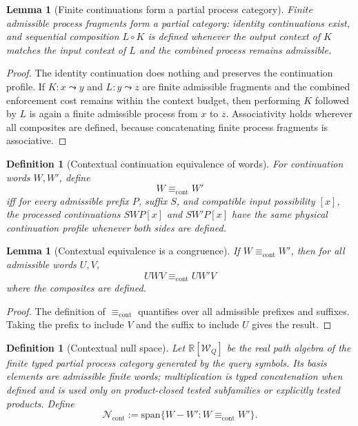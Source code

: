 \documentclass[11pt]{article}
\newtheorem{lemma}[theorem]{Lemma}
\newtheorem{definition}[theorem]{Definition}
\begin{document}
\begin{lemma}[Finite continuations form a partial process category]
Finite admissible process fragments form a partial category: identity continuations exist, and sequential composition $L\circ K$ is defined whenever the output context of $K$ matches the input context of $L$ and the combined process remains admissible.
\end{lemma}
\begin{proof}
The identity continuation does nothing and preserves the continuation profile.  If $K:x\leadsto y$ and $L:y\leadsto z$ are finite admissible fragments and the combined enforcement cost remains within the context budget, then performing $K$ followed by $L$ is again a finite admissible process from $x$ to $z$.  Associativity holds wherever all composites are defined, because concatenating finite process fragments is associative.
\end{proof}

\begin{definition}[Contextual continuation equivalence of words]
For continuation words $W,W'$, define
\[
 W\equiv_{\mathrm{cont}}W'
\]
iff for every admissible prefix $P$, suffix $S$, and compatible input possibility $[x]$, the processed continuations $SWP[x]$ and $SW'P[x]$ have the same physical continuation profile whenever both sides are defined.
\end{definition}

\begin{lemma}[Contextual equivalence is a congruence]
If $W\equiv_{\mathrm{cont}}W'$, then for all admissible words $U,V$,
\[
 U W V\equiv_{\mathrm{cont}} U W' V
\]
where the composites are defined.
\end{lemma}
\begin{proof}
The definition of $\equiv_{\mathrm{cont}}$ quantifies over all admissible prefixes and suffixes.  Taking the prefix to include $V$ and the suffix to include $U$ gives the result.
\end{proof}

\begin{definition}[Contextual null space]
Let $\mathbb R[\mathcal W_Q]$ be the real path algebra of the finite typed partial process category generated by the query symbols.  Its basis elements are admissible finite words; multiplication is typed concatenation when defined and is used only on product-closed tested subfamilies or explicitly tested products.  Define
\[
 \mathcal N_{\mathrm{cont}}
 :=\mathrm{span}\{W-W': W\equiv_{\mathrm{cont}}W'\}.
\]
\end{definition}
\end{document}
